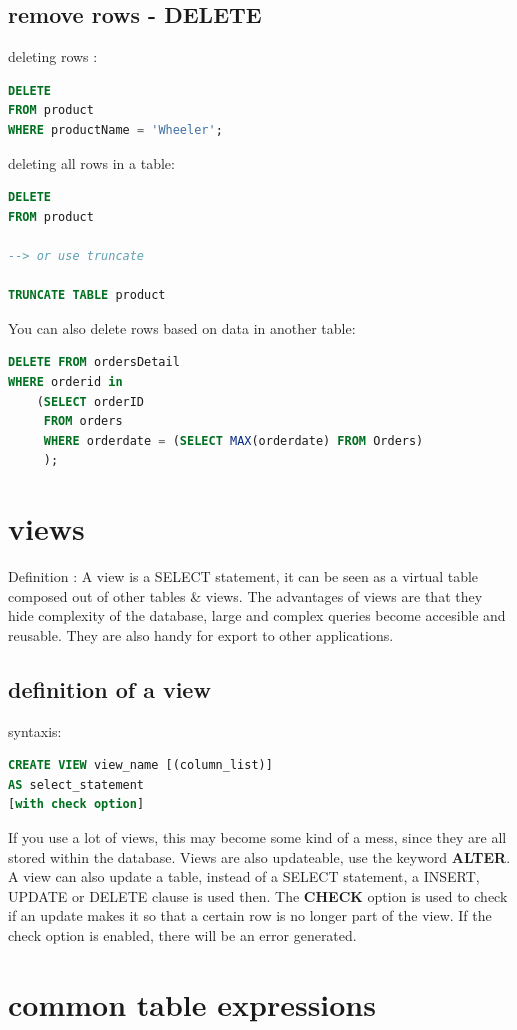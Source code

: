 \documentclass{report}
\begin{document}
	\subsection{remove rows - DELETE}
	deleting rows : 
	\begin{lstlisting}[language=SQL]
DELETE
FROM product
WHERE productName = 'Wheeler';\end{lstlisting}
	deleting all rows in a table: 
	\begin{lstlisting}[language=SQL]
DELETE
FROM product

--> or use truncate

TRUNCATE TABLE product		\end{lstlisting} 
	You can also delete rows based on data in another table: 
	\begin{lstlisting}[language=SQL]
DELETE FROM ordersDetail
WHERE orderid in 
	(SELECT orderID 
	 FROM orders
	 WHERE orderdate = (SELECT MAX(orderdate) FROM Orders)
	 );\end{lstlisting}
	
	\section{views}
	Definition : A view is a SELECT statement, it can be seen as a virtual table composed out of other tables \& views. The advantages of views are that they hide complexity of the database, large and complex queries become accesible and reusable. They are also handy for export to other applications.
	\subsection{definition of a view}
	syntaxis: 
	\begin{lstlisting}[language=sql]
CREATE VIEW view_name [(column_list)]
AS select_statement
[with check option]\end{lstlisting}
	If you use a lot of views, this may become some kind of a mess, since they are all stored within the database. Views are also updateable, use the keyword \textbf{ALTER}.
	A view can also update a table, instead of a SELECT statement, a INSERT, UPDATE or DELETE clause is used then. The \textbf{CHECK} option is used to check if an update makes it so that a certain row is no longer part of the view. If the check option is enabled, there will be an error generated.
	
	\section{common table expressions}
\end{document}
